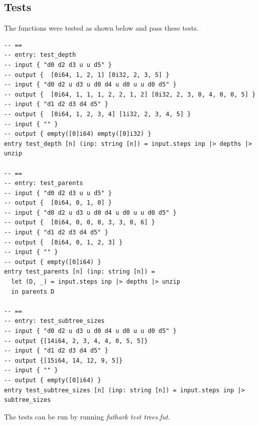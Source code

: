 \subsection*{Tests}
The functions were tested as shown below and pass these tests.
\begin{lstlisting}[language={futhark}]
-- ==
-- entry: test_depth
-- input { "d0 d2 d3 u u d5" }
-- output {  [0i64, 1, 2, 1] [0i32, 2, 3, 5] }
-- input { "d0 d2 u d3 u d0 d4 u d0 u u d0 d5" }
-- output {  [0i64, 1, 1, 1, 2, 2, 1, 2] [0i32, 2, 3, 0, 4, 0, 0, 5] }
-- input { "d1 d2 d3 d4 d5" }
-- output {  [0i64, 1, 2, 3, 4] [1i32, 2, 3, 4, 5] }
-- input { "" }
-- output { empty([0]i64) empty([0]i32) }
entry test_depth [n] (inp: string [n]) = input.steps inp |> depths |> unzip

-- ==
-- entry: test_parents
-- input { "d0 d2 d3 u u d5" }
-- output {  [0i64, 0, 1, 0] }
-- input { "d0 d2 u d3 u d0 d4 u d0 u u d0 d5" }
-- output {  [0i64, 0, 0, 0, 3, 3, 0, 6] }
-- input { "d1 d2 d3 d4 d5" }
-- output {  [0i64, 0, 1, 2, 3] }
-- input { "" }
-- output { empty([0]i64) }
entry test_parents [n] (inp: string [n]) =
  let (D, _) = input.steps inp |> depths |> unzip
  in parents D

-- ==
-- entry: test_subtree_sizes
-- input { "d0 d2 u d3 u d0 d4 u d0 u u d0 d5" }
-- output {[14i64, 2, 3, 4, 4, 0, 5, 5]}
-- input { "d1 d2 d3 d4 d5" }
-- output {[15i64, 14, 12, 9, 5]}
-- input { "" }
-- output { empty([0]i64) }
entry test_subtree_sizes [n] (inp: string [n]) = input.steps inp |> subtree_sizes
\end{lstlisting}

The tests can be run by running \emph{futhark test trees.fut}.
